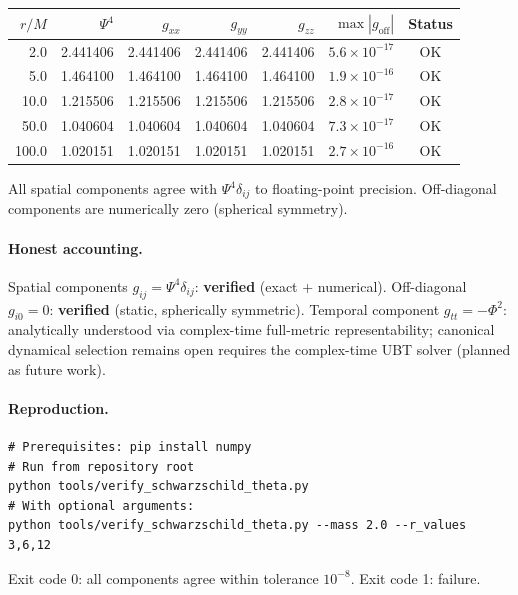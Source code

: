 \documentclass[12pt,a4paper]{article}
\theoremstyle{definition}
\theoremstyle{remark}
\begin{document}
\begin{center}
\begin{tabular}{rrrrrrc}
\toprule
$r/M$ & $\Psi^4$ & $g_{xx}$ & $g_{yy}$ & $g_{zz}$ & $\max|g_\mathrm{off}|$ & Status \\
\midrule
2.0   & 2.441406 & 2.441406 & 2.441406 & 2.441406 & $5.6\times10^{-17}$ & OK \\
5.0   & 1.464100 & 1.464100 & 1.464100 & 1.464100 & $1.9\times10^{-16}$ & OK \\
10.0  & 1.215506 & 1.215506 & 1.215506 & 1.215506 & $2.8\times10^{-17}$ & OK \\
50.0  & 1.040604 & 1.040604 & 1.040604 & 1.040604 & $7.3\times10^{-17}$ & OK \\
100.0 & 1.020151 & 1.020151 & 1.020151 & 1.020151 & $2.7\times10^{-16}$ & OK \\
\bottomrule
\end{tabular}
\end{center}

All spatial components agree with $\Psi^4\delta_{ij}$ to floating-point precision.
Off-diagonal components are numerically zero (spherical symmetry).

\paragraph{Honest accounting.}
Spatial components $g_{ij} = \Psi^4\delta_{ij}$: \textbf{verified} (exact + numerical).
Off-diagonal $g_{i0} = 0$: \textbf{verified} (static, spherically symmetric).
Temporal component $g_{tt} = -\Phi^2$: analytically understood via complex-time
full-metric representability; canonical dynamical selection remains open
requires the complex-time UBT solver (planned as future work).

\paragraph{Reproduction.}
\begin{verbatim}
# Prerequisites: pip install numpy
# Run from repository root
python tools/verify_schwarzschild_theta.py
# With optional arguments:
python tools/verify_schwarzschild_theta.py --mass 2.0 --r_values 3,6,12
\end{verbatim}
Exit code 0: all components agree within tolerance $10^{-8}$.
Exit code 1: failure.



\end{document}

